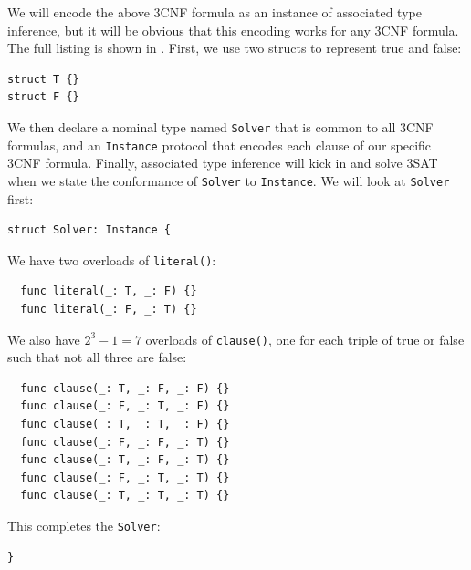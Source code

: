 \documentclass[../generics]{subfiles}
\begin{document}
We will encode the above 3CNF formula as an instance of associated type inference, but it will be obvious that this encoding works for any 3CNF formula. The full listing is shown in . First, we use two structs to represent true and false:
\begin{Verbatim}
struct T {}
struct F {}
\end{Verbatim}
We then declare a nominal type named \texttt{Solver} that is common to all 3CNF formulas, and an \texttt{Instance} protocol that encodes each clause of our specific 3CNF formula. Finally, associated type inference will kick in and solve 3SAT when we state the conformance of \texttt{Solver} to \texttt{Instance}. We will look at \texttt{Solver} first:
\begin{Verbatim}
struct Solver: Instance {
\end{Verbatim}
We have two overloads of \verb|literal()|:
\begin{Verbatim}
  func literal(_: T, _: F) {}
  func literal(_: F, _: T) {}
\end{Verbatim}
We also have $2^3-1=7$ overloads of \verb|clause()|, one for each triple of true or false such that not all three are false:
\begin{Verbatim}
  func clause(_: T, _: F, _: F) {}
  func clause(_: F, _: T, _: F) {}
  func clause(_: T, _: T, _: F) {}
  func clause(_: F, _: F, _: T) {}
  func clause(_: T, _: F, _: T) {}
  func clause(_: F, _: T, _: T) {}
  func clause(_: T, _: T, _: T) {}
\end{Verbatim}
This completes the \texttt{Solver}:
\begin{Verbatim}
}
\end{Verbatim}
\pagebreak
\end{document}
